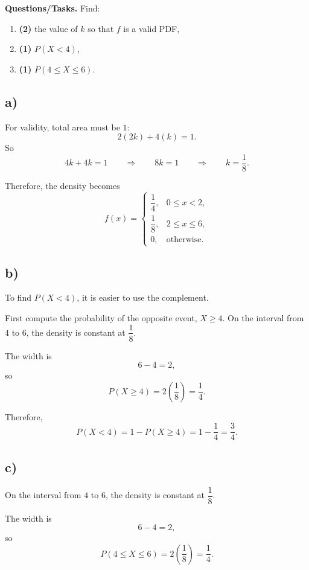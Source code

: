 \textbf{Questions/Tasks.}
Find:
\begin{enumerate}[label=\textbf{\alph*)}]
	\item \textbf{(2)} the value of $k$ so that $f$ is a valid PDF,
	\item \textbf{(1)} $P(X<4)$,
	\item \textbf{(1)} $P(4\le X\le 6)$.
\end{enumerate}



\subsection*{a)}
For validity, total area must be $1$:
\[
2(2k)+4(k)=1.
\]
So
\[
4k+4k=1
\qquad \Rightarrow \qquad
8k=1
\qquad \Rightarrow \qquad
k=\frac{1}{8}.
\]

Therefore, the density becomes
\[
f(x)=
\begin{cases}
	\dfrac{1}{4}, & 0\le x<2,\\[6pt]
	\dfrac{1}{8}, & 2\le x\le 6,\\[6pt]
	0, & \text{otherwise.}
\end{cases}
\]


\subsection*{b)}
To find $P(X<4)$, it is easier to use the complement.

First compute the probability of the opposite event, $X\ge 4$. On the interval from $4$ to $6$, the density is constant at $\dfrac{1}{8}$.

The width is
\[
6-4=2,
\]
so
\[
P(X\ge 4)=2\left(\frac{1}{8}\right)=\frac{1}{4}.
\]

Therefore,
\[
P(X<4)=1-P(X\ge 4)=1-\frac{1}{4}=\frac{3}{4}.
\]


\subsection*{c)}
On the interval from $4$ to $6$, the density is constant at $\dfrac{1}{8}$.

The width is
\[
6-4=2,
\]
so
\[
P(4\le X\le 6)=2\left(\frac{1}{8}\right)=\frac{1}{4}.
\]


